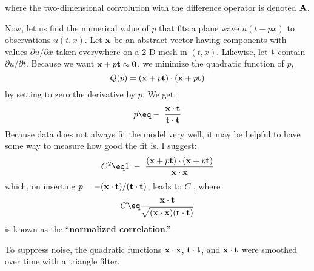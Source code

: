 where the two-dimensional convolution with the difference operator is denoted ${\bf A}$.
\par
Now, let us find the numerical value of $p$ that fits a plane wave
$u(t-px)$ to  observations $u (t , x )$. Let $\bold x$ be an abstract
vector having components with values $\partial u /\partial x$ taken
everywhere on a 2-D mesh in $(t,x)$. Likewise, let $\bold t$ contain $\partial u /\partial t$.  Because we want ${\bf x} + p {\bf t} \approx {\bf 0}$, we minimize the quadratic function of $p$, 
\begin{equation}
Q( p) = ({\bf x} + p {\bf t}) \cdot ({\bf x} + p {\bf t}) 
\end{equation}
by setting to zero the derivative by $p$. We get:
\begin{equation}
p \eq - \ \frac{ {\bf x} \cdot {\bf t} }{ {\bf t} \cdot {\bf t} } 
\end{equation}
Because data does not always fit the model very well, it may be helpful to have some way to measure how good the fit is. I suggest:
\begin{equation}
C^2 \eq 1 \ -\  \frac{ ({\bf x} + p {\bf t}) \cdot ({\bf x} + p {\bf t}) }{ {\bf x} \cdot {\bf x}} 
\end{equation}
which, on inserting $p=-({\bf x} \cdot {\bf t})/({\bf t} \cdot {\bf t})$, leads to $C$ , where 
\begin{equation}
C \eq \frac{ {\bf x} \cdot {\bf t} } { \sqrt{ ( {\bf x} \cdot {\bf x} ) ( {\bf t}\cdot{\bf t}) }}
\end{equation} 
is known as the ``{\bf normalized correlation}.''   



To suppress noise, the quadratic functions
$\bold x \cdot \bold x$,
$\bold t \cdot \bold t$, and
$\bold x \cdot \bold t$
were smoothed over time with a triangle filter.



